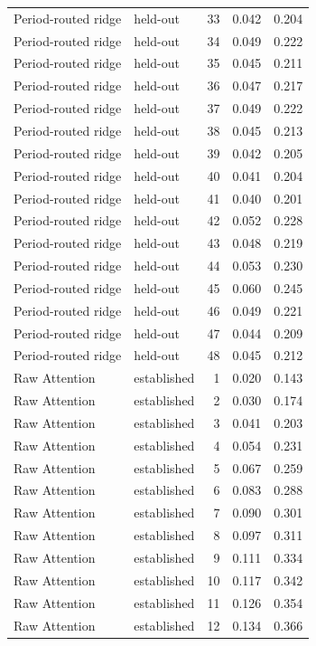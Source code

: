 \begin{tabular}{llrrr}
Period-routed ridge & held-out & 33 & 0.042 & 0.204 \\
Period-routed ridge & held-out & 34 & 0.049 & 0.222 \\
Period-routed ridge & held-out & 35 & 0.045 & 0.211 \\
Period-routed ridge & held-out & 36 & 0.047 & 0.217 \\
Period-routed ridge & held-out & 37 & 0.049 & 0.222 \\
Period-routed ridge & held-out & 38 & 0.045 & 0.213 \\
Period-routed ridge & held-out & 39 & 0.042 & 0.205 \\
Period-routed ridge & held-out & 40 & 0.041 & 0.204 \\
Period-routed ridge & held-out & 41 & 0.040 & 0.201 \\
Period-routed ridge & held-out & 42 & 0.052 & 0.228 \\
Period-routed ridge & held-out & 43 & 0.048 & 0.219 \\
Period-routed ridge & held-out & 44 & 0.053 & 0.230 \\
Period-routed ridge & held-out & 45 & 0.060 & 0.245 \\
Period-routed ridge & held-out & 46 & 0.049 & 0.221 \\
Period-routed ridge & held-out & 47 & 0.044 & 0.209 \\
Period-routed ridge & held-out & 48 & 0.045 & 0.212 \\
Raw Attention & established & 1 & 0.020 & 0.143 \\
Raw Attention & established & 2 & 0.030 & 0.174 \\
Raw Attention & established & 3 & 0.041 & 0.203 \\
Raw Attention & established & 4 & 0.054 & 0.231 \\
Raw Attention & established & 5 & 0.067 & 0.259 \\
Raw Attention & established & 6 & 0.083 & 0.288 \\
Raw Attention & established & 7 & 0.090 & 0.301 \\
Raw Attention & established & 8 & 0.097 & 0.311 \\
Raw Attention & established & 9 & 0.111 & 0.334 \\
Raw Attention & established & 10 & 0.117 & 0.342 \\
Raw Attention & established & 11 & 0.126 & 0.354 \\
Raw Attention & established & 12 & 0.134 & 0.366 \\

\end{tabular}
